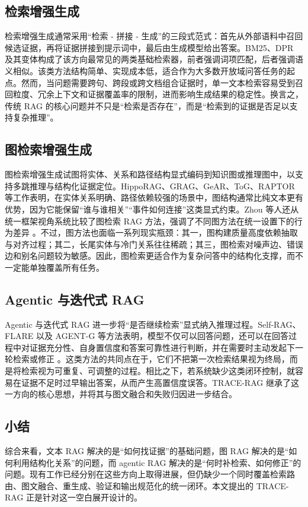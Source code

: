﻿\documentclass[UTF8,11pt,twocolumn]{ctexart}
\begin{document}
\subsection{检索增强生成}
检索增强生成通常采用“检索 - 拼接 - 生成”的三段式范式：首先从外部语料中召回候选证据，再将证据拼接到提示词中，最后由生成模型给出答案。BM25、DPR 及其变体构成了该方向最常见的两类基础检索器，前者强调词项匹配，后者强调语义相似。该类方法结构简单、实现成本低，适合作为大多数开放域问答任务的起点。然而，当问题需要跨句、跨段或跨文档组合证据时，单一文本检索容易受到召回粒度、冗余上下文和证据覆盖率的限制，进而影响生成结果的稳定性。换言之，传统 RAG 的核心问题并不只是“检索是否存在”，而是“检索到的证据是否足以支持复杂推理”。

\subsection{图检索增强生成}
图检索增强生成试图将实体、关系和路径结构显式编码到知识图或推理图中，以支持多跳推理与结构化证据定位。HippoRAG、GRAG、GeAR、ToG、RAPTOR 等工作表明，在实体关系明确、路径依赖较强的场景中，图结构通常比纯文本更有优势，因为它能保留“谁与谁相关”“事件如何连接”这类显式约束。Zhou 等人还从统一框架视角系统比较了图检索 RAG 方法，强调了不同图方法在统一设置下的行为差异 \cite{zhou2025graphragunified}。不过，图方法也面临一系列现实瓶颈：其一，图构建质量高度依赖抽取与对齐过程；其二，长尾实体与冷门关系往往稀疏；其三，图检索对噪声边、错误边和别名问题较为敏感。因此，图检索更适合作为复杂问答中的结构化支撑，而不一定能单独覆盖所有任务。

\subsection{Agentic 与迭代式 RAG}
Agentic 与迭代式 RAG 进一步将“是否继续检索”显式纳入推理过程。Self-RAG、FLARE 以及 AGENT-G 等方法表明，模型不仅可以回答问题，还可以在回答过程中对证据充分性、自身置信度和答案可靠性进行判断，并在需要时主动发起下一轮检索或修正 \cite{asai2023selfrag,jiang2023flare,agentg2025}。这类方法的共同点在于，它们不把第一次检索结果视为终局，而是将检索视为可重复、可调整的过程。相比之下，若系统缺少这类闭环控制，就容易在证据不足时过早输出答案，从而产生高置信度误答。TRACE-RAG 继承了这一方向的核心思想，并将其与图文融合和失败归因进一步结合。

\subsection{小结}

综合来看，文本 RAG 解决的是“如何找证据”的基础问题，图 RAG 解决的是“如何利用结构化关系”的问题，而 agentic RAG 解决的是“何时补检索、如何修正”的问题。现有工作已经分别在这些方向上取得进展，但仍缺少一个同时覆盖检索路由、图文融合、重生成、验证和输出规范化的统一闭环。本文提出的 TRACE-RAG 正是针对这一空白展开设计的。
\end{document}
